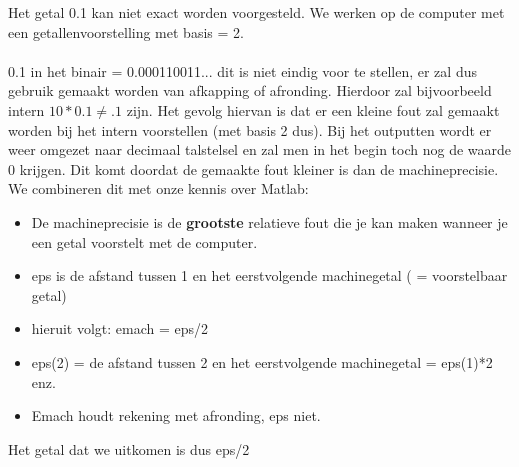 Het getal 0.1 kan niet exact worden voorgesteld. We werken op de computer met een getallenvoorstelling met basis = 2.\\
\\
0.1 in het binair = 0.000110011... dit is niet eindig voor te stellen, er zal dus gebruik gemaakt worden van afkapping of afronding. Hierdoor zal bijvoorbeeld intern $10 * 0.1 \neq . 1 $ zijn. Het gevolg hiervan is dat er een kleine fout zal gemaakt worden bij het intern voorstellen (met basis 2 dus). Bij het outputten wordt er weer omgezet naar decimaal talstelsel en zal men in het begin toch nog de waarde 0 krijgen. Dit komt doordat de gemaakte fout kleiner is dan de machineprecisie. 
\\
We combineren dit met onze kennis over Matlab:
\begin{itemize}
\item De machineprecisie is de \textbf{grootste} relatieve fout die je kan maken wanneer je een getal voorstelt met de computer.
\item eps is de afstand tussen 1 en het eerstvolgende machinegetal ( = voorstelbaar getal)
\item hieruit volgt: emach = eps/2
\item eps(2) = de afstand tussen 2 en het eerstvolgende machinegetal = eps(1)*2 enz. 
\item Emach houdt rekening met afronding, eps niet.
\end{itemize}
Het getal dat we uitkomen is dus eps/2